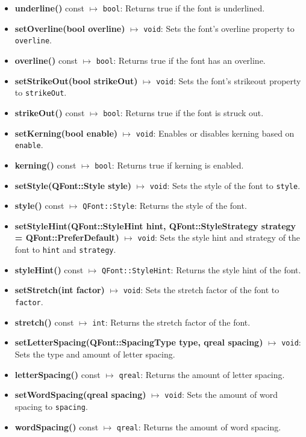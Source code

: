\documentclass{report}
\begin{document}
\begin{itemize}
        \item \textbf{underline()} const $\mapsto$ \texttt{bool}: Returns true if the font is underlined.
        \item \textbf{setOverline(bool overline)} $\mapsto$ \texttt{void}: Sets the font's overline property to \texttt{overline}.
        \item \textbf{overline()} const $\mapsto$ \texttt{bool}: Returns true if the font has an overline.
        \item \textbf{setStrikeOut(bool strikeOut)} $\mapsto$ \texttt{void}: Sets the font's strikeout property to \texttt{strikeOut}.
        \item \textbf{strikeOut()} const $\mapsto$ \texttt{bool}: Returns true if the font is struck out.
        \item \textbf{setKerning(bool enable)} $\mapsto$ \texttt{void}: Enables or disables kerning based on \texttt{enable}.
        \item \textbf{kerning()} const $\mapsto$ \texttt{bool}: Returns true if kerning is enabled.
        \item \textbf{setStyle(QFont::Style style)} $\mapsto$ \texttt{void}: Sets the style of the font to \texttt{style}.
        \item \textbf{style()} const $\mapsto$ \texttt{QFont::Style}: Returns the style of the font.
        \item \textbf{setStyleHint(QFont::StyleHint hint, QFont::StyleStrategy strategy = QFont::PreferDefault)} $\mapsto$ \texttt{void}: Sets the style hint and strategy of the font to \texttt{hint} and \texttt{strategy}.
        \item \textbf{styleHint()} const $\mapsto$ \texttt{QFont::StyleHint}: Returns the style hint of the font.
        \item \textbf{setStretch(int factor)} $\mapsto$ \texttt{void}: Sets the stretch factor of the font to \texttt{factor}.
        \item \textbf{stretch()} const $\mapsto$ \texttt{int}: Returns the stretch factor of the font.
        \item \textbf{setLetterSpacing(QFont::SpacingType type, qreal spacing)} $\mapsto$ \texttt{void}: Sets the type and amount of letter spacing.
        \item \textbf{letterSpacing()} const $\mapsto$ \texttt{qreal}: Returns the amount of letter spacing.
        \item \textbf{setWordSpacing(qreal spacing)} $\mapsto$ \texttt{void}: Sets the amount of word spacing to \texttt{spacing}.
        \item \textbf{wordSpacing()} const $\mapsto$ \texttt{qreal}: Returns the amount of word spacing.
    \end{itemize}
\end{document}
